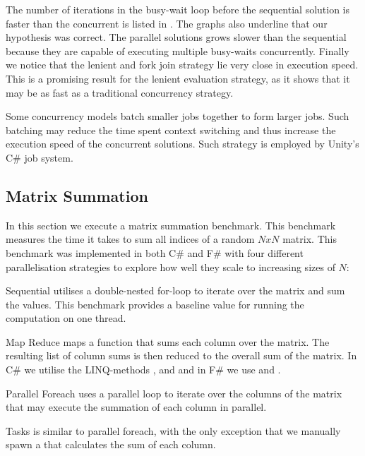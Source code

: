 
The number of iterations in the busy-wait loop before the sequential solution is faster than the concurrent is listed in . The graphs also underline that our hypothesis was correct. The parallel solutions grows slower than the sequential because they are capable of executing multiple busy-waits concurrently. Finally we notice that the lenient and fork join strategy lie very close in execution speed. This is a promising result for the lenient evaluation strategy, as it shows that it may be as fast as a traditional concurrency strategy.

Some concurrency models batch smaller jobs together to form larger jobs\needcite. Such batching may reduce the time spent context switching and thus increase the execution speed of the concurrent solutions. Such strategy is employed by Unity's C\# job system\cite{unity:csharp:job:system}.

\subsection{Matrix Summation}
In this section we execute a matrix summation benchmark. This benchmark measures the time it takes to sum all indices of a random $N x N$ matrix. This benchmark was implemented in both C\# and F\# with four different parallelisation strategies to explore how well they scale to increasing sizes of $N$:

\begin{labeling}{\quad\quad}
    \item[Sequential] utilises a double-nested for-loop to iterate over the matrix and sum the values. This benchmark provides a baseline value for running the computation on one thread.
    \item[Map Reduce] maps a function that sums each column over the matrix. The resulting list of column sums is then reduced to the overall sum of the matrix. In C\# we utilise the \gls{LINQ}-methods ,  and  and in F\# we use  and .
    \item[Parallel Foreach] uses a parallel loop to iterate over the columns of the matrix that may execute the summation of each column in parallel.
    \item[Tasks] is similar to parallel foreach, with the only exception that we manually spawn a  that calculates the sum of each column.
\end{labeling}

